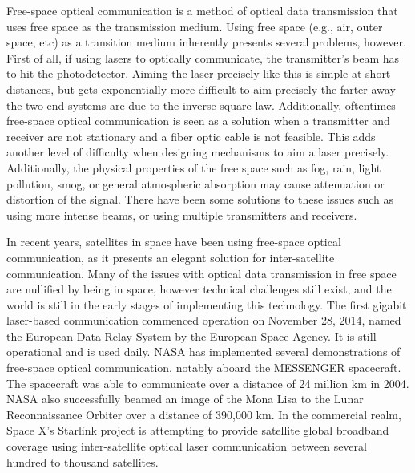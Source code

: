 \documentclass[11pt]{article}
\begin{document}
Free-space optical communication is a method of optical data transmission that uses free space as the transmission medium. Using free space (e.g., air, outer space, etc) as a transition medium inherently presents several problems, however. First of all, if using lasers to optically communicate, the transmitter’s beam has to hit the photodetector. Aiming the laser precisely like this is simple at short distances, but gets exponentially more difficult to aim precisely the farter away the two end systems are due to the inverse square law. Additionally, oftentimes free-space optical communication is seen as a solution when a transmitter and receiver are not stationary and a fiber optic cable is not feasible. This adds another level of difficulty when designing mechanisms to aim a laser precisely. Additionally, the physical properties of the free space such as fog, rain, light pollution, smog, or general atmospheric absorption may cause attenuation or distortion of the signal. There have been some solutions to these issues such as using more intense beams, or using multiple transmitters and receivers.

In recent years, satellites in space have been using free-space optical communication, as it presents an elegant solution for inter-satellite communication. Many of the issues with optical data transmission in free space are nullified by being in space, however technical challenges still exist, and the world is still in the early stages of implementing this technology. The first gigabit laser-based communication commenced operation on November 28, 2014, named the European Data Relay System by the European Space Agency. It is still operational and is used daily. NASA has implemented several demonstrations of free-space optical communication, notably aboard the MESSENGER spacecraft. The spacecraft was able to communicate over a distance of 24 million km in 2004. NASA also successfully beamed an image of the Mona Lisa to the Lunar Reconnaissance Orbiter over a distance of 390,000 km. In the commercial realm, Space X’s Starlink project is attempting to provide satellite global broadband coverage using inter-satellite optical laser communication between several hundred to thousand satellites. 

\nocite{*}
\printbibliography
\end{document}

